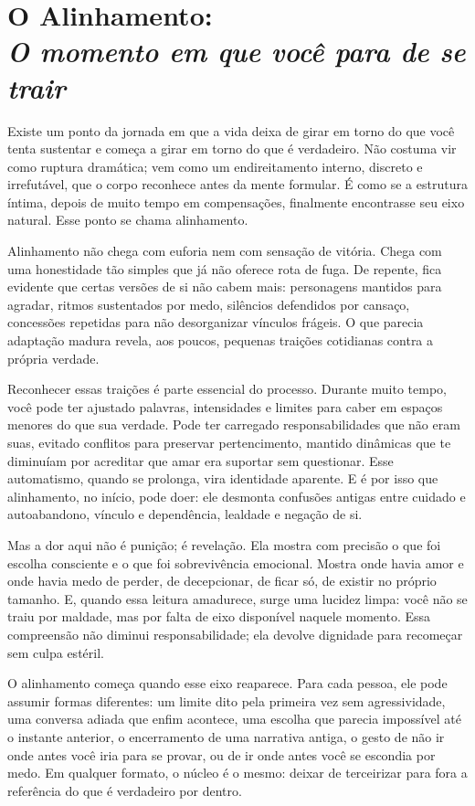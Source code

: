 \documentclass[12pt]{book}
\begin{document}
\chapter[O Alinhamento: O momento em que você para de se trair]{O Alinhamento:\\[0.4ex]\large\itshape O momento em que você para de se trair}

Existe um ponto da jornada em que a vida deixa de girar em torno do que você tenta sustentar e começa a girar em torno do que é verdadeiro. Não costuma vir como ruptura dramática; vem como um endireitamento interno, discreto e irrefutável, que o corpo reconhece antes da mente formular. É como se a estrutura íntima, depois de muito tempo em compensações, finalmente encontrasse seu eixo natural. Esse ponto se chama alinhamento.

Alinhamento não chega com euforia nem com sensação de vitória. Chega com uma honestidade tão simples que já não oferece rota de fuga. De repente, fica evidente que certas versões de si não cabem mais: personagens mantidos para agradar, ritmos sustentados por medo, silêncios defendidos por cansaço, concessões repetidas para não desorganizar vínculos frágeis. O que parecia adaptação madura revela, aos poucos, pequenas traições cotidianas contra a própria verdade.

Reconhecer essas traições é parte essencial do processo. Durante muito tempo, você pode ter ajustado palavras, intensidades e limites para caber em espaços menores do que sua verdade. Pode ter carregado responsabilidades que não eram suas, evitado conflitos para preservar pertencimento, mantido dinâmicas que te diminuíam por acreditar que amar era suportar sem questionar. Esse automatismo, quando se prolonga, vira identidade aparente. E é por isso que alinhamento, no início, pode doer: ele desmonta confusões antigas entre cuidado e autoabandono, vínculo e dependência, lealdade e negação de si.

Mas a dor aqui não é punição; é revelação. Ela mostra com precisão o que foi escolha consciente e o que foi sobrevivência emocional. Mostra onde havia amor e onde havia medo de perder, de decepcionar, de ficar só, de existir no próprio tamanho. E, quando essa leitura amadurece, surge uma lucidez limpa: você não se traiu por maldade, mas por falta de eixo disponível naquele momento. Essa compreensão não diminui responsabilidade; ela devolve dignidade para recomeçar sem culpa estéril.

O alinhamento começa quando esse eixo reaparece. Para cada pessoa, ele pode assumir formas diferentes: um limite dito pela primeira vez sem agressividade, uma conversa adiada que enfim acontece, uma escolha que parecia impossível até o instante anterior, o encerramento de uma narrativa antiga, o gesto de não ir onde antes você iria para se provar, ou de ir onde antes você se escondia por medo. Em qualquer formato, o núcleo é o mesmo: deixar de terceirizar para fora a referência do que é verdadeiro por dentro.
\end{document}
